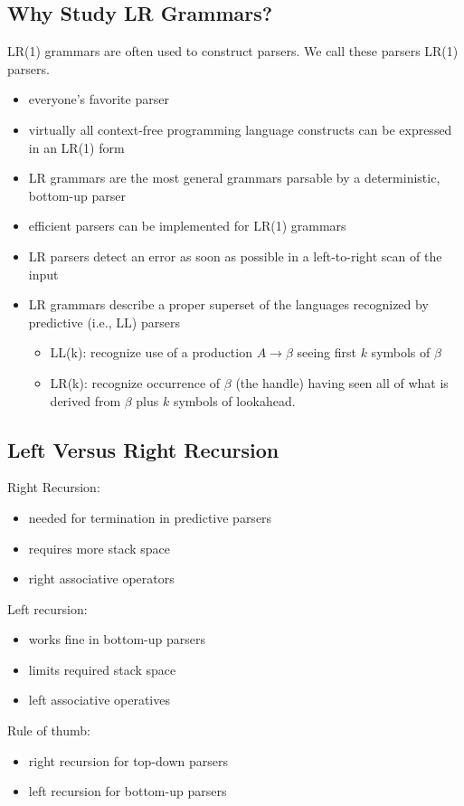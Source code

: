 \documentclass[10pt]{article}
\begin{document}
\subsection*{Why Study LR Grammars?}
LR(1) grammars are often used to construct parsers.  We call these parsers LR(1) parsers.
\begin{itemize}
    \item everyone's favorite parser
    \item virtually all context-free programming language constructs can be expressed in an LR(1) form
    \item LR grammars are the most general grammars parsable by a deterministic, bottom-up parser
    \item efficient parsers can be implemented for LR(1) grammars
    \item LR parsers detect an error as soon as possible in a left-to-right scan of the input
    \item LR grammars describe a proper superset of the languages recognized by predictive (i.e., LL) parsers
    \begin{itemize}
        \item LL(k): recognize use of a production $A \rightarrow \beta$ seeing first $k$ symbols of $\beta$
        \item LR(k): recognize occurrence of $\beta$ (the handle) having seen all of what is derived from $\beta$ plus $k$ symbols of lookahead.
    \end{itemize}
\end{itemize}

\subsection*{Left Versus Right Recursion}
Right Recursion:
\begin{itemize}
    \item needed for termination in predictive parsers
    \item requires more stack space
    \item right associative operators
\end{itemize}
Left recursion:
\begin{itemize}
    \item works fine in bottom-up parsers
    \item limits required stack space
    \item left associative operatives
\end{itemize}
Rule of thumb:
\begin{itemize}
    \item right recursion for top-down parsers
    \item left recursion for bottom-up parsers
\end{itemize}
\end{document}

